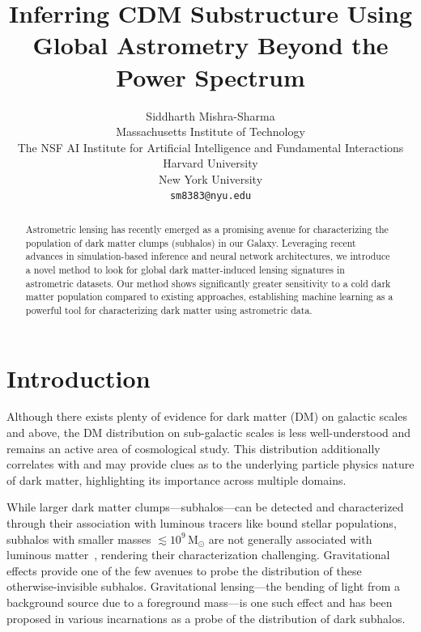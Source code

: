 \documentclass[]{article}
\title{Inferring CDM Substructure Using \\ Global Astrometry Beyond the Power Spectrum}
\author{
Siddharth Mishra-Sharma \\
Massachusetts Institute of Technology \\
The NSF AI Institute for Artificial Intelligence and Fundamental Interactions \\
Harvard University \\ 
New York University \\
\texttt{sm8383@nyu.edu} \\
}
\begin{document}
\maketitle

\begin{abstract}
Astrometric lensing has recently emerged as a promising avenue for characterizing the population of dark matter clumps (subhalos) in our Galaxy. Leveraging recent advances in simulation-based inference and neural network architectures, we introduce a novel method to look for global dark matter-induced lensing signatures in astrometric datasets. Our method shows significantly greater sensitivity to a cold dark matter population compared to existing approaches, establishing machine learning as a powerful tool for characterizing dark matter using astrometric data. 
\end{abstract}

\section{Introduction}
\label{sec:intro}

Although there exists plenty of evidence for dark matter (DM) on galactic scales and above,
the DM distribution on sub-galactic scales is less well-understood and remains an active area of cosmological study. This distribution additionally correlates with and may provide clues as to the underlying particle physics nature of dark matter, highlighting its importance across multiple domains. 

While larger dark matter clumps---subhalos---can be detected and characterized through their association with luminous tracers like bound stellar populations, subhalos with smaller masses $\lesssim 10^9\,\mathrm M_\odot$ are not generally associated with luminous matter~\cite{Fitts:2016usl,2017MNRAS.467.2019R}, rendering their characterization challenging. Gravitational effects provide one of the few avenues to probe the distribution of these otherwise-invisible subhalos. Gravitational lensing---the bending of light from a background source due to a foreground mass---is one such effect and has been proposed in various incarnations as a probe of the distribution of dark subhalos. 
\end{document}
